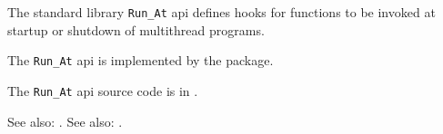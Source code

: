 
The standard library {\tt Run\_At} api defines hooks for 
functions to be invoked at startup or shutdown of multithread programs.

The {\tt Run\_At} api is implemented by the  package.

The {\tt Run\_At} api source code is in .

See also: .
See also: .






